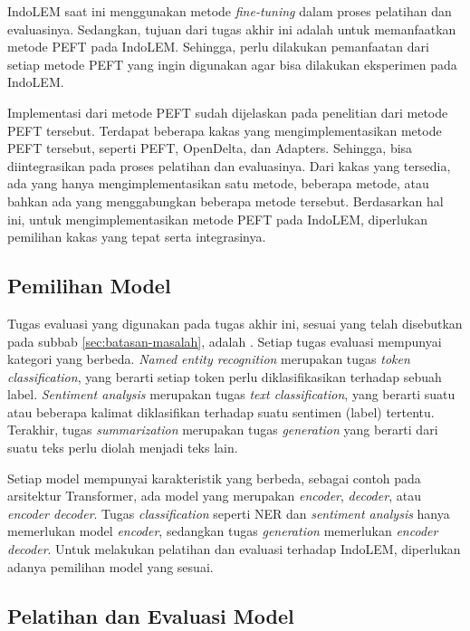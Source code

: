 IndoLEM saat ini menggunakan metode \textit{fine-tuning} dalam proses pelatihan dan evaluasinya. Sedangkan, tujuan dari tugas akhir ini adalah untuk memanfaatkan metode PEFT pada IndoLEM. Sehingga, perlu dilakukan pemanfaatan dari setiap metode PEFT yang ingin digunakan agar bisa dilakukan eksperimen pada IndoLEM.

Implementasi dari metode PEFT sudah dijelaskan pada penelitian dari metode PEFT tersebut. Terdapat beberapa kakas yang mengimplementasikan metode PEFT tersebut, seperti PEFT, OpenDelta, dan Adapters. Sehingga, bisa diintegrasikan pada proses pelatihan dan evaluasinya. Dari kakas yang tersedia, ada yang hanya mengimplementasikan satu metode, beberapa metode, atau bahkan ada yang menggabungkan beberapa metode tersebut. Berdasarkan hal ini, untuk mengimplementasikan metode PEFT pada IndoLEM, diperlukan pemilihan kakas yang tepat serta integrasinya.

\subsection{Pemilihan Model}

Tugas evaluasi yang digunakan pada tugas akhir ini, sesuai yang telah disebutkan pada subbab \ref{sec:batasan-masalah}, adalah \nlptask. Setiap tugas evaluasi mempunyai kategori yang berbeda. \textit{Named entity recognition} merupakan tugas \textit{token classification}, yang berarti setiap token perlu diklasifikasikan terhadap sebuah label. \textit{Sentiment analysis} merupakan tugas \textit{text classification},  yang berarti suatu atau beberapa kalimat diklasifikan terhadap suatu sentimen (label) tertentu. Terakhir, tugas \textit{summarization} merupakan tugas \textit{generation} yang berarti dari suatu teks perlu diolah menjadi teks lain.

Setiap model mempunyai karakteristik yang berbeda, sebagai contoh pada arsitektur Transformer, ada model yang merupakan \textit{encoder}, \textit{decoder}, atau \textit{encoder decoder}. Tugas \textit{classification} seperti NER dan \textit{sentiment analysis} hanya memerlukan model \textit{encoder}, sedangkan tugas \textit{generation} memerlukan \textit{encoder decoder}. Untuk melakukan pelatihan dan evaluasi terhadap IndoLEM, diperlukan adanya pemilihan model yang sesuai.

\subsection{Pelatihan dan Evaluasi Model}


